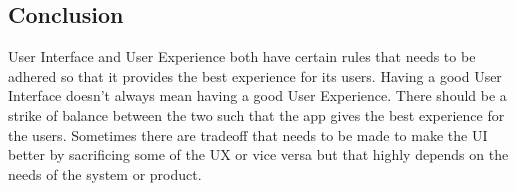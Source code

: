 \documentclass[12pt,titlepage]{article}
\begin{document}
\subsection{Conclusion}
User Interface and User Experience both have certain rules that needs to be adhered so that it provides the best experience for its users.
Having a good User Interface doesn't always mean having a good User Experience. There should be a strike of balance between the two
such that the app gives the best experience for the users. Sometimes there are tradeoff that needs to be made to make the 
UI better by sacrificing some of the UX or vice versa but that highly depends on the needs of the system or product.
\end{document}
